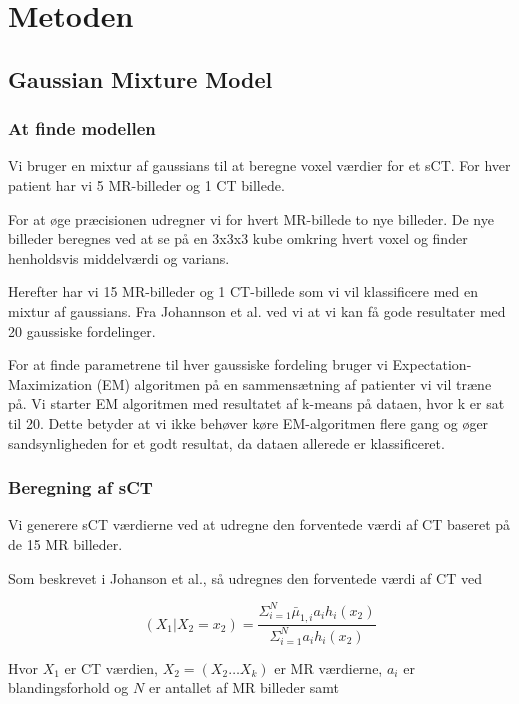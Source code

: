 \section{Metoden}
\subsection{Gaussian Mixture Model}

\subsubsection{At finde modellen}
Vi bruger en mixtur af gaussians til at beregne voxel værdier
for et sCT. For hver patient har vi 5 MR-billeder og 1 CT billede.

For at øge præcisionen udregner vi for hvert MR-billede
to nye billeder. De nye billeder beregnes ved at se på en 3x3x3
kube omkring hvert voxel og finder henholdsvis middelværdi og varians.

Herefter har vi 15 MR-billeder og 1 CT-billede som vi vil klassificere
med en mixtur af gaussians. Fra Johannson et al. ved vi at vi kan få
gode resultater med 20 gaussiske fordelinger. 

For at finde parametrene til hver gaussiske fordeling bruger vi
Expectation-Maximization (EM) algoritmen på en sammensætning af patienter
vi vil træne på. Vi starter EM algoritmen med resultatet af k-means på
dataen, hvor k er sat til 20. Dette betyder at vi ikke behøver køre
EM-algoritmen flere gang og øger sandsynligheden for et godt resultat, da
dataen allerede er klassificeret.




\subsubsection{Beregning af sCT}

Vi generere sCT værdierne ved at udregne den forventede værdi af CT baseret på de 15 MR billeder. 

Som beskrevet i Johanson et al., så udregnes den forventede værdi af CT ved

\begin{equation}
(X_1 | X_2 = x_2) = \frac{\Sigma^{N}_{i=1} \bar{\mu}_{1,i} a_i h_i(x_2)}{\Sigma^{N}_{i=1} a_i h_i(x_2)}
\end{equation}

Hvor $X_1$ er CT værdien, $X_2 = (X_2 \dots X_k)$ er MR værdierne, $a_i$ er blandingsforhold og $N$ er antallet af MR billeder samt

